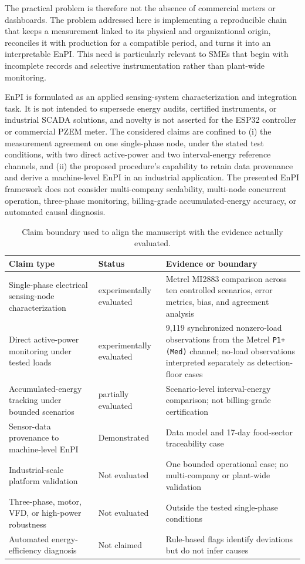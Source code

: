 \documentclass[technologies,article,submit,pdftex,moreauthors]{Definitions/mdpi}
\begin{document}
The practical problem is therefore not the absence of commercial meters or dashboards. The problem addressed here is implementing a reproducible chain that keeps a measurement linked to its physical and organizational origin, reconciles it with production for a compatible period, and turns it into an interpretable EnPI. This need is particularly relevant to SMEs that begin with incomplete records and selective instrumentation rather than plant-wide monitoring.

EnPI is formulated as an applied sensing-system characterization and integration task. It is not intended to supersede energy audits, certified instruments, or industrial SCADA solutions, and novelty is not asserted for the ESP32 controller or commercial PZEM meter. The considered claims are confined to (i) the measurement agreement on one 
single-phase node, under the stated test conditions, with two direct active-power and two interval-energy reference channels, and (ii) the proposed procedure's capability to retain data provenance and derive a machine-level EnPI in an industrial application. The presented EnPI framework does not consider multi-company scalability, multi-node concurrent operation, three-phase monitoring, billing-grade accumulated-energy accuracy, or automated causal diagnosis. 

\begin{table}[t]
\caption{Claim boundary used to align the manuscript with the evidence actually evaluated.}
\label{tab:claim-boundary}
\centering
\small
\begin{tabularx}{0.92\textwidth}{p{}p{}X}
\toprule
Claim type & Status & Evidence or boundary \\
\midrule
Single-phase electrical sensing-node characterization & experimentally evaluated & Metrel MI2883 comparison across ten controlled scenarios, error metrics, bias, and agreement analysis \\
Direct active-power monitoring under tested loads & experimentally evaluated & 9,119 synchronized nonzero-load observations from the Metrel \texttt{P1+(Med)} channel; no-load observations interpreted separately as detection-floor cases \\
Accumulated-energy tracking under bounded scenarios & partially evaluated & Scenario-level interval-energy comparison; not billing-grade certification \\
Sensor-data provenance to machine-level EnPI & Demonstrated & Data model and 17-day food-sector traceability case \\
Industrial-scale platform validation & Not evaluated & One bounded operational case; no multi-company or plant-wide validation \\
Three-phase, motor, VFD, or high-power robustness & Not evaluated & Outside the tested single-phase conditions \\
Automated energy-efficiency diagnosis & Not claimed & Rule-based flags identify deviations but do not infer causes \\
\bottomrule
\end{tabularx}
\end{table}
\end{document}
